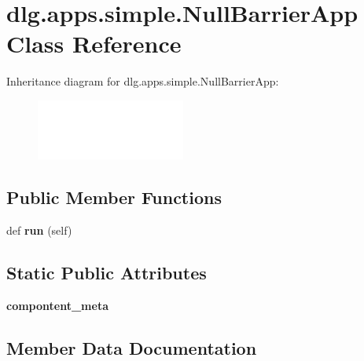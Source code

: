 \hypertarget{classdlg_1_1apps_1_1simple_1_1_null_barrier_app}{}\section{dlg.\+apps.\+simple.\+Null\+Barrier\+App Class Reference}
\label{classdlg_1_1apps_1_1simple_1_1_null_barrier_app}
Inheritance diagram for dlg.\+apps.\+simple.\+Null\+Barrier\+App\+:\begin{figure}[H]
\begin{center}
\leavevmode
\includegraphics[height=2.000000cm]{classdlg_1_1apps_1_1simple_1_1_null_barrier_app}
\end{center}
\end{figure}
\subsection*{Public Member Functions}
\begin{DoxyCompactItemize}
\item 
\mbox{\label{classdlg_1_1apps_1_1simple_1_1_null_barrier_app_ae67eda225b1f3eae9c364cef074c917f}} 
def {\bfseries run} (self)
\end{DoxyCompactItemize}
\subsection*{Static Public Attributes}
\begin{DoxyCompactItemize}
\item 
{\bfseries compontent\+\_\+meta}
\end{DoxyCompactItemize}


\subsection{Member Data Documentation}
\mbox{\label{classdlg_1_1apps_1_1simple_1_1_null_barrier_app_a4d2c527e1fffdf515bbd3fced21ac190}} 
